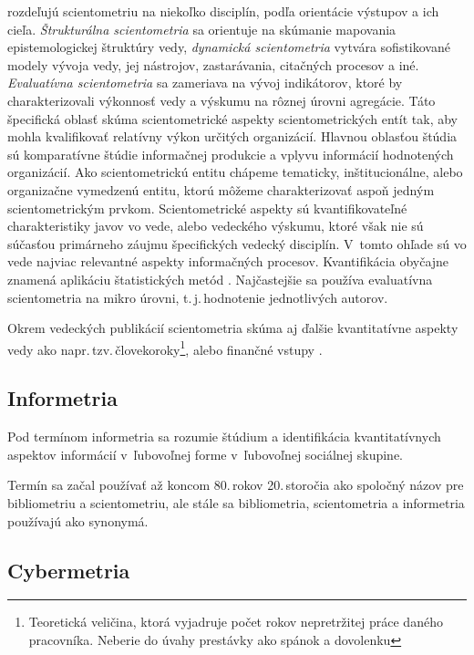 \citet{Glanzel2004} rozdeľujú scientometriu na niekoľko disciplín, podľa
orientácie výstupov a ich cieľa.  \emph{Štrukturálna scientometria} sa orientuje
na skúmanie mapovania epistemologickej štruktúry vedy, \emph{dynamická
  scientometria} vytvára sofistikované modely vývoja vedy, jej nástrojov,
zastarávania, citačných procesov a iné.  \emph{Evaluatívna scientometria} sa
zameriava na vývoj indikátorov, ktoré by charakterizovali výkonnosť vedy a
výskumu na rôznej úrovni agregácie.  Táto špecifická oblasť skúma
scientometrické aspekty scientometrických entít tak, aby mohla kvalifikovať
relatívny výkon určitých organizácií.  Hlavnou oblasťou štúdia sú komparatívne
štúdie informačnej produkcie a vplyvu informácií hodnotených organizácií.  Ako
scientometrickú entitu chápeme tematicky, inštitucionálne, alebo organizačne
vymedzenú entitu, ktorú môžeme charakterizovať aspoň jedným scientometrickým
prvkom.  Scientometrické aspekty sú kvantifikovateľné charakteristiky javov vo
vede, alebo vedeckého výskumu, ktoré však nie sú súčasťou primárneho záujmu
špecifických vedecký disciplín.  V~tomto ohľade sú vo vede najviac relevantné
aspekty informačných procesov.  Kvantifikácia obyčajne znamená aplikáciu
štatistických metód \citep{Vinkler2001}.  Najčastejšie sa používa evaluatívna
scientometria na mikro úrovni, t.\,j.\,hodnotenie jednotlivých autorov.

Okrem vedeckých publikácií scientometria skúma aj ďalšie kvantitatívne aspekty
vedy ako napr.\,tzv.\,človekoroky\footnote{Teoretická veličina, ktorá vyjadruje
  počet rokov nepretržitej práce daného pracovníka.  Neberie do úvahy prestávky
  ako spánok a dovolenku}, alebo finančné vstupy \citep{Bellis2009}.


\subsection{Informetria}

Pod termínom informetria sa rozumie štúdium a identifikácia kvantitatívnych
aspektov informácií v~ľubovoľnej forme v~ľubovoľnej sociálnej skupine.

Termín sa začal používať až koncom 80.\,rokov 20.\,storočia ako spoločný názov
pre bibliometriu a scientometriu, ale stále sa bibliometria, scientometria a
informetria používajú ako synonymá.


\subsection{Cybermetria}


